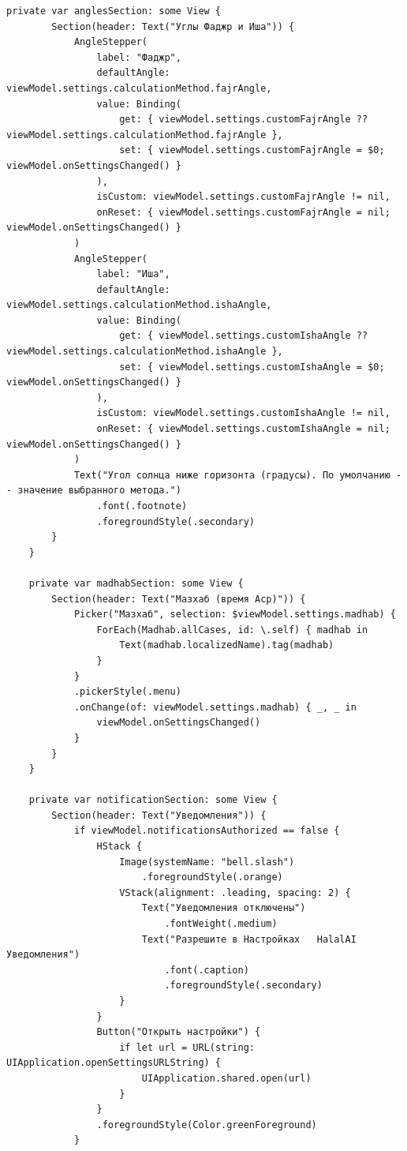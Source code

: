 \begin{lstlisting}[basicstyle=\tiny\ttfamily,breaklines=true]
    private var anglesSection: some View {
        Section(header: Text("Углы Фаджр и Иша")) {
            AngleStepper(
                label: "Фаджр",
                defaultAngle: viewModel.settings.calculationMethod.fajrAngle,
                value: Binding(
                    get: { viewModel.settings.customFajrAngle ?? viewModel.settings.calculationMethod.fajrAngle },
                    set: { viewModel.settings.customFajrAngle = $0; viewModel.onSettingsChanged() }
                ),
                isCustom: viewModel.settings.customFajrAngle != nil,
                onReset: { viewModel.settings.customFajrAngle = nil; viewModel.onSettingsChanged() }
            )
            AngleStepper(
                label: "Иша",
                defaultAngle: viewModel.settings.calculationMethod.ishaAngle,
                value: Binding(
                    get: { viewModel.settings.customIshaAngle ?? viewModel.settings.calculationMethod.ishaAngle },
                    set: { viewModel.settings.customIshaAngle = $0; viewModel.onSettingsChanged() }
                ),
                isCustom: viewModel.settings.customIshaAngle != nil,
                onReset: { viewModel.settings.customIshaAngle = nil; viewModel.onSettingsChanged() }
            )
            Text("Угол солнца ниже горизонта (градусы). По умолчанию -- значение выбранного метода.")
                .font(.footnote)
                .foregroundStyle(.secondary)
        }
    }

    private var madhabSection: some View {
        Section(header: Text("Мазхаб (время Аср)")) {
            Picker("Мазхаб", selection: $viewModel.settings.madhab) {
                ForEach(Madhab.allCases, id: \.self) { madhab in
                    Text(madhab.localizedName).tag(madhab)
                }
            }
            .pickerStyle(.menu)
            .onChange(of: viewModel.settings.madhab) { _, _ in
                viewModel.onSettingsChanged()
            }
        }
    }

    private var notificationSection: some View {
        Section(header: Text("Уведомления")) {
            if viewModel.notificationsAuthorized == false {
                HStack {
                    Image(systemName: "bell.slash")
                        .foregroundStyle(.orange)
                    VStack(alignment: .leading, spacing: 2) {
                        Text("Уведомления отключены")
                            .fontWeight(.medium)
                        Text("Разрешите в Настройках   HalalAI   Уведомления")
                            .font(.caption)
                            .foregroundStyle(.secondary)
                    }
                }
                Button("Открыть настройки") {
                    if let url = URL(string: UIApplication.openSettingsURLString) {
                        UIApplication.shared.open(url)
                    }
                }
                .foregroundStyle(Color.greenForeground)
            }


\end{lstlisting}
